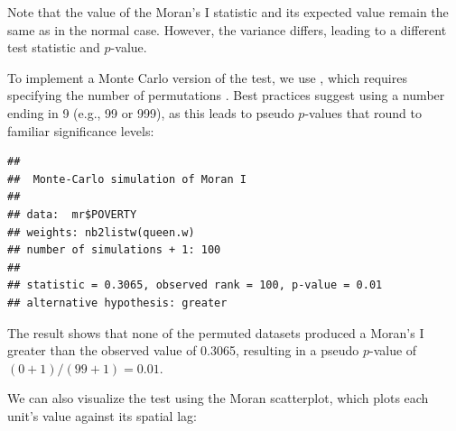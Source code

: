 Note that the value of the Moran’s I statistic and its expected value remain the same as in the normal case. However, the variance differs, leading to a different test statistic and $p$-value.

To implement a Monte Carlo version of the test, we use , which requires specifying the number of permutations . Best practices suggest using a number ending in 9 (e.g., 99 or 999), as this leads to pseudo $p$-values that round to familiar significance levels:


\begin{knitrout}
\color{fgcolor}\begin{kframe}
\begin{alltt}
\hldef{(}\hldef{)}
\hlopt{$}  \hldef{=} 
            \hldef{=} \hldef{)}
\end{alltt}
\begin{verbatim}
## 
## 	Monte-Carlo simulation of Moran I
## 
## data:  mr$POVERTY 
## weights: nb2listw(queen.w)  
## number of simulations + 1: 100 
## 
## statistic = 0.3065, observed rank = 100, p-value = 0.01
## alternative hypothesis: greater
\end{verbatim}
\end{kframe}
\end{knitrout}

The result shows that none of the permuted datasets produced a Moran’s I greater than the observed value of 0.3065, resulting in a pseudo $p$-value of $(0 + 1)/(99 + 1) = 0.01$.

We can also visualize the test using the Moran scatterplot, which plots each unit’s value against its spatial lag:

\begin{knitrout}
\color{fgcolor}\begin{kframe}
\begin{alltt}
\hlopt{$}  \hldef{=} 
\end{alltt}
\end{kframe}
\end{knitrout}

